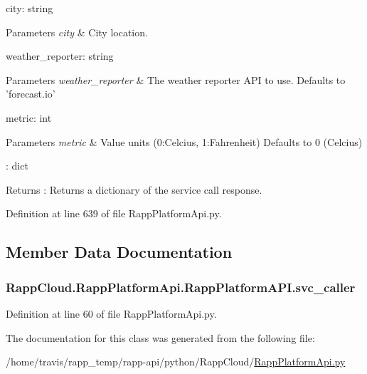 city\-: string 
\begin{DoxyParams}{Parameters}
{\em city} & City location.\\
\hline
\end{DoxyParams}
weather\-\_\-reporter\-: string 
\begin{DoxyParams}{Parameters}
{\em weather\-\_\-reporter} & The weather reporter A\-P\-I to use. Defaults to 'forecast.\-io'\\
\hline
\end{DoxyParams}
metric\-: int 
\begin{DoxyParams}{Parameters}
{\em metric} & Value units (0\-:Celcius, 1\-:Fahrenheit) Defaults to 0 (Celcius)\\
\hline
\end{DoxyParams}
\-: dict \begin{DoxyReturn}{Returns}
\-: Returns a dictionary of the service call response. 
\end{DoxyReturn}


Definition at line 639 of file Rapp\-Platform\-Api.\-py.



\subsection{Member Data Documentation}
\hypertarget{classRappCloud_1_1RappPlatformApi_1_1RappPlatformAPI_a72e99fbc8af8485f5508084477bc88c0}{
\subsubsection[{svc\-\_\-caller}]{\setlength{\rightskip}{0pt plus 5cm}Rapp\-Cloud.\-Rapp\-Platform\-Api.\-Rapp\-Platform\-A\-P\-I.\-svc\-\_\-caller}}\label{classRappCloud_1_1RappPlatformApi_1_1RappPlatformAPI_a72e99fbc8af8485f5508084477bc88c0}


Definition at line 60 of file Rapp\-Platform\-Api.\-py.



The documentation for this class was generated from the following file\-:\begin{DoxyCompactItemize}
\item 
/home/travis/rapp\-\_\-temp/rapp-\/api/python/\-Rapp\-Cloud/\hyperlink{RappPlatformApi_8py}{Rapp\-Platform\-Api.\-py}\end{DoxyCompactItemize}
